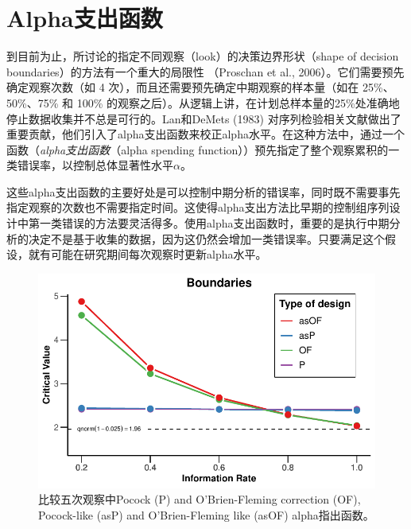 \documentclass[
  letterpaper,
  DIV=11,
  numbers=noendperiod]{scrreprt}
\begin{document}
\hypertarget{alphaux652fux51faux51fdux6570}{%
\section{Alpha支出函数}\label{alphaux652fux51faux51fdux6570}}

到目前为止，所讨论的指定不同观察（look）的决策边界形状（shape of
decision boundaries）的方法有一个重大的局限性 （Proschan et al.,
2006）。它们需要预先确定观察次数（如 4
次），而且还需要预先确定中期观察的样本量（如在 25\%、50\%、75\% 和 100\%
的观察之后）。从逻辑上讲，在计划总样本量的25\%处准确地停止数据收集并不总是可行的。Lan和DeMets
(1983)
对序列检验相关文献做出了重要贡献，他们引入了alpha支出函数来校正alpha水平。在这种方法中，通过一个函数（\emph{alpha支出函数}（alpha
spending
function））预先指定了整个观察累积的一类错误率，以控制总体显著性水平\(\alpha\)。

这些alpha支出函数的主要好处是可以控制中期分析的错误率，同时既不需要事先指定观察的次数也不需要指定时间。这使得alpha支出方法比早期的控制组序列设计中第一类错误的方法要灵活得多。使用alpha支出函数时，重要的是执行中期分析的决定不是基于收集的数据，因为这仍然会增加一类错误率。只要满足这个假设，就有可能在研究期间每次观察时更新alpha水平。

\begin{figure}

{\centering \includegraphics[width=1\textwidth,height=\textheight]{10-sequential_files/figure-pdf/fig-comparison-1.pdf}

}

\caption{\label{fig-comparison}比较五次观察中Pocock (P) and
O'Brien-Fleming correction (OF), Pocock-like (asP) and O'Brien-Fleming
like (asOF) alpha指出函数。}

\end{figure}
\end{document}
